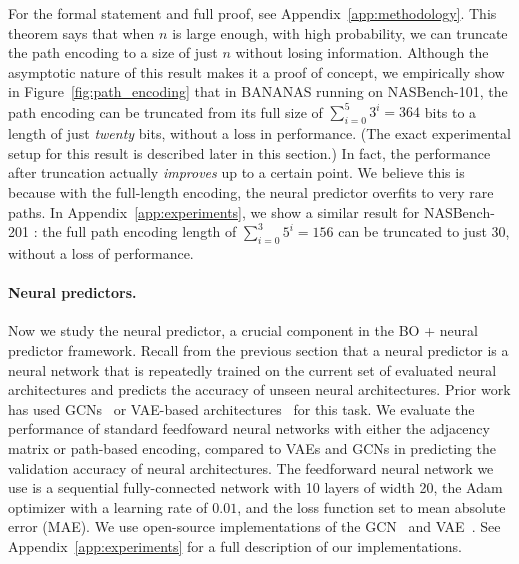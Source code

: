 \documentclass[11pt]{article}
\numberwithin{equation}{section}
\numberwithin{figure}{section}
\theoremstyle{plain}
\theoremstyle{definition}
\begin{document}
For the formal statement and full proof, see 
Appendix~\ref{app:methodology}.
This theorem says that when $n$ is large enough, with high probability, 
we can truncate the path encoding to a size of just $n$ without losing information.
Although the asymptotic nature of this result makes it a proof of concept, 
we empirically show in Figure~\ref{fig:path_encoding} that in BANANAS running on
NASBench-101,
the path encoding can be truncated from its full size of 
$\sum_{i=0}^5 3^i=364$ bits to a length of just \emph{twenty} bits,
without a loss in performance. (The exact experimental setup for this result is 
described later in this section.)
In fact, the performance after truncation actually \emph{improves} up to a certain
point. We believe this is because with the full-length encoding, 
the neural predictor overfits to very rare paths.
In Appendix~\ref{app:experiments},
we show a similar result for NASBench-201 \cite{nasbench201}:
the full path encoding length of $\sum_{i=0}^3 5^i=156$ can be truncated to just 30, 
without a loss of performance.

\begin{comment}
\begin{figure}
\centering
    \texttt{[image: fig/path\_length.pdf]}
    \caption{Performance of BANANAS with the path encoding truncated to different
    lengths. Since each node has 3 choices of operations, the ``natural''
    cutoffs are at powers of 3.
    }
    \label{fig:path_length}
\end{figure}
\end{comment}




\paragraph{Neural predictors.}
Now we study the neural predictor, a crucial component in the BO + neural predictor
framework. 
Recall from the previous section that a neural predictor is a neural network 
that is repeatedly trained on the current set of evaluated 
neural architectures and predicts the
accuracy of unseen neural architectures. 
Prior work has used GCNs~\cite{shi2019multi, ma2019deep}
or VAE-based architectures~\cite{dvae} for this task.
We evaluate the performance of standard feedfoward
neural networks with either the adjacency matrix or path-based encoding,
compared to VAEs and GCNs in predicting the validation accuracy 
of neural architectures.
The feedforward neural network we use is a sequential fully-connected
network with 10 layers of width 20, 
the Adam optimizer with a learning rate of $0.01$, 
and the loss function set to mean absolute error (MAE).
We use open-source implementations of the GCN~\cite{zhang2020neural}
and VAE~\cite{dvae}. 
See Appendix~\ref{app:experiments}
for a full 
description of our implementations.
\end{document}
